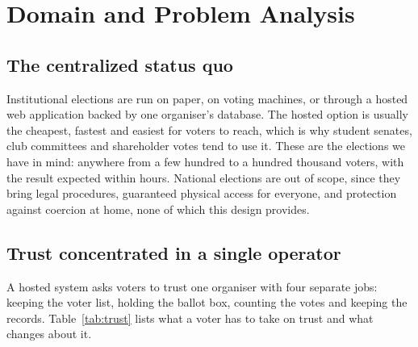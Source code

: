 
\section{Domain and Problem Analysis}

\subsection{The centralized status quo}

Institutional elections are run on paper, on voting machines, or through a
hosted web application backed by one organiser's database. The hosted option is
usually the cheapest, fastest and easiest for voters to reach, which is why
student senates, club committees and shareholder votes tend to use it. These
are the elections we have in mind: anywhere from a few hundred to a hundred
thousand voters, with the result expected within hours. National elections are
out of scope, since they bring legal procedures, guaranteed physical access for
everyone, and protection against coercion at home, none of which this design
provides.

\subsection{Trust concentrated in a single operator}

A hosted system asks voters to trust one organiser with four separate jobs:
keeping the voter list, holding the ballot box, counting the votes and keeping
the records. Table~\ref{tab:trust} lists what a voter has to take on trust and
what \projectname{} changes about it.

